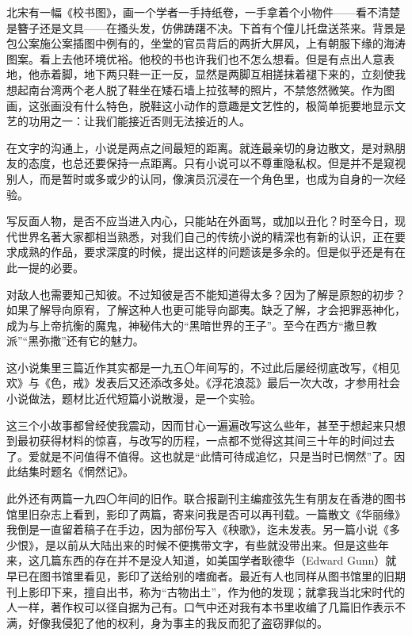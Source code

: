 \par 北宋有一幅《校书图》，画一个学者一手持纸卷，一手拿着个小物件——看不清楚是簪子还是文具——在搔头发，仿佛踌躇不决。下首有个僮儿托盘送茶来。背景是包公案施公案插图中例有的，坐堂的官员背后的两折大屏风，上有朝服下缘的海涛图案。看上去他环境优裕。他校的书也许我们也不怎么想看。但是有点出人意表地，他赤着脚，地下两只鞋一正一反，显然是两脚互相搓抹着褪下来的，立刻使我想起南台湾两个老人脱了鞋坐在矮石墙上拉弦琴的照片，不禁悠然微笑。作为图画，这张画没有什么特色，脱鞋这小动作的意趣是文艺性的，极简单扼要地显示文艺的功用之一：让我们能接近否则无法接近的人。
\par 在文字的沟通上，小说是两点之间最短的距离。就连最亲切的身边散文，是对熟朋友的态度，也总还要保持一点距离。只有小说可以不尊重隐私权。但是并不是窥视别人，而是暂时或多或少的认同，像演员沉浸在一个角色里，也成为自身的一次经验。
\par 写反面人物，是否不应当进入内心，只能站在外面骂，或加以丑化？时至今日，现代世界名著大家都相当熟悉，对我们自己的传统小说的精深也有新的认识，正在要求成熟的作品，要求深度的时候，提出这样的问题该是多余的。但是似乎还是有在此一提的必要。
\par 对敌人也需要知己知彼。不过知彼是否不能知道得太多？因为了解是原恕的初步？如果了解导向原宥，了解这种人也更可能导向鄙夷。缺乏了解，才会把罪恶神化，成为与上帝抗衡的魔鬼，神秘伟大的“黑暗世界的王子”。至今在西方“撒旦教派”“黑弥撒”还有它的魅力。
\par 这小说集里三篇近作其实都是一九五〇年间写的，不过此后屡经彻底改写，《相见欢》与《色，戒》发表后又还添改多处。《浮花浪蕊》最后一次大改，才参用社会小说做法，题材比近代短篇小说散漫，是一个实验。
\par 这三个小故事都曾经使我震动，因而甘心一遍遍改写这么些年，甚至于想起来只想到最初获得材料的惊喜，与改写的历程，一点都不觉得这其间三十年的时间过去了。爱就是不问值得不值得。这也就是“此情可待成追忆，只是当时已惘然”了。因此结集时题名《惘然记》。
\par 此外还有两篇一九四〇年间的旧作。联合报副刊主编痖弦先生有朋友在香港的图书馆里旧杂志上看到，影印了两篇，寄来问我是否可以再刊载。一篇散文《华丽缘》我倒是一直留着稿子在手边，因为部份写入《秧歌》，迄未发表。另一篇小说《多少恨》，是以前从大陆出来的时候不便携带文字，有些就没带出来。但是这些年来，这几篇东西的存在并不是没人知道，如美国学者耿德华（Edward Gunn）就早已在图书馆里看见，影印了送给别的嗜痂者。最近有人也同样从图书馆里的旧期刊上影印下来，擅自出书，称为“古物出土”，作为他的发现；就拿我当北宋时代的人一样，著作权可以径自据为己有。口气中还对我有本书里收编了几篇旧作表示不满，好像我侵犯了他的权利，身为事主的我反而犯了盗窃罪似的。
